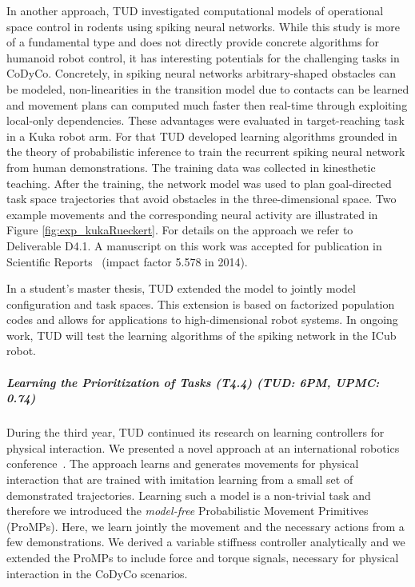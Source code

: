 In another approach, TUD investigated computational models of operational space 
control in rodents using spiking neural networks. While this study is more of a 
fundamental type and does not directly provide concrete algorithms for humanoid 
robot control, it has interesting potentials for the challenging tasks in 
CoDyCo. Concretely, in spiking neural networks arbitrary-shaped obstacles can be 
modeled, non-linearities in the transition model due to contacts can be learned 
and movement plans can computed much faster then real-time through exploiting 
local-only dependencies. These advantages were evaluated in target-reaching task 
in a Kuka robot arm. For that TUD developed learning algorithms grounded in the 
theory of probabilistic inference to train the recurrent spiking neural network 
from human demonstrations. The training data was collected in kinesthetic 
teaching. After the training, the network model was used to plan goal-directed 
task space trajectories that avoid obstacles in the three-dimensional space. Two 
example movements and the corresponding neural activity are illustrated in 
Figure \ref{fig:exp_kukaRueckert}. For details on the approach we refer to 
Deliverable D4.1. A manuscript on this work was accepted for publication in 
Scientific Reports~\cite{Rueckert_SR_2016} (impact factor 5.578 in 2014). 

In a student's master thesis, TUD extended the model to jointly model 
configuration and task spaces. This extension is based on factorized population 
codes and allows for applications to high-dimensional robot systems. In ongoing 
work, TUD will test the learning algorithms of the spiking network in the ICub 
robot.    


\subparagraph{Learning the Prioritization of Tasks (T4.4) (TUD: 6PM, UPMC: 0.74)}%

During the third year, TUD continued its research on learning controllers for 
physical interaction. We presented a novel approach at an international robotics 
conference~\cite{paraschos2015model}. The approach learns and generates 
movements for physical interaction that are trained with imitation learning from 
a small set of demonstrated trajectories. Learning such a model is a non-trivial 
task and therefore we introduced the \textit{model-free} Probabilistic Movement 
Primitives (ProMPs). Here, we learn jointly the movement and the necessary 
actions from a few demonstrations. We derived a variable stiffness controller 
analytically and we extended the ProMPs to include force and torque signals, 
necessary for physical interaction in the CoDyCo scenarios. 

